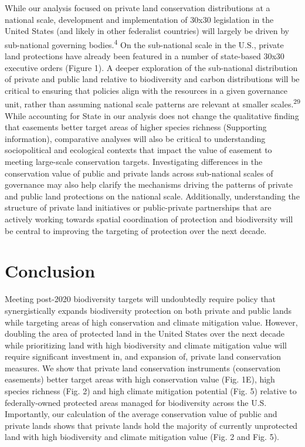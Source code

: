 \documentclass[3p]{elsarticle} %
\begin{document}
While our analysis focused on private land conservation distributions at
a national scale, development and implementation of 30x30 legislation in
the United States (and likely in other federalist countries) will
largely be driven by sub-national governing bodies.\textsuperscript{4}
On the sub-national scale in the U.S., private land protections have
already been featured in a number of state-based 30x30 executive orders
(Figure 1). A deeper exploration of the sub-national distribution of
private and public land relative to biodiversity and carbon
distributions will be critical to ensuring that policies align with the
resources in a given governance unit, rather than assuming national
scale patterns are relevant at smaller scales.\textsuperscript{29} While
accounting for State in our analysis does not change the qualitative
finding that easements better target areas of higher species richness
(Supporting information), comparative analyses will also be critical to
understanding sociopolitical and ecological contexts that impact the
value of easement to meeting large-scale conservation targets.
Investigating differences in the conservation value of public and
private lands across sub-national scales of governance may also help
clarify the mechanisms driving the patterns of private and public land
protections on the national scale. Additionally, understanding the
structure of private land initiatives or public-private partnerships
that are actively working towards spatial coordination of protection and
biodiversity will be central to improving the targeting of protection
over the next decade.

\hypertarget{conclusion}{%
\section{Conclusion}\label{conclusion}}

Meeting post-2020 biodiversity targets will undoubtedly require policy
that synergistically expands biodiversity protection on both private and
public lands while targeting areas of high conservation and climate
mitigation value. However, doubling the area of protected land in the
United States over the next decade while prioritizing land with high
biodiversity and climate mitigation value will require significant
investment in, and expansion of, private land conservation measures. We
show that private land conservation instruments (conservation easements)
better target areas with high conservation value (Fig. 1E), high species
richness (Fig. 2) and high climate mitigation potential (Fig. 5)
relative to federally-owned protected areas managed for biodiversity
across the U.S. Importantly, our calculation of the average conservation
value of public and private lands shows that private lands hold the
majority of currently unprotected land with high biodiversity and
climate mitigation value (Fig. 2 and Fig. 5).
\end{document}
